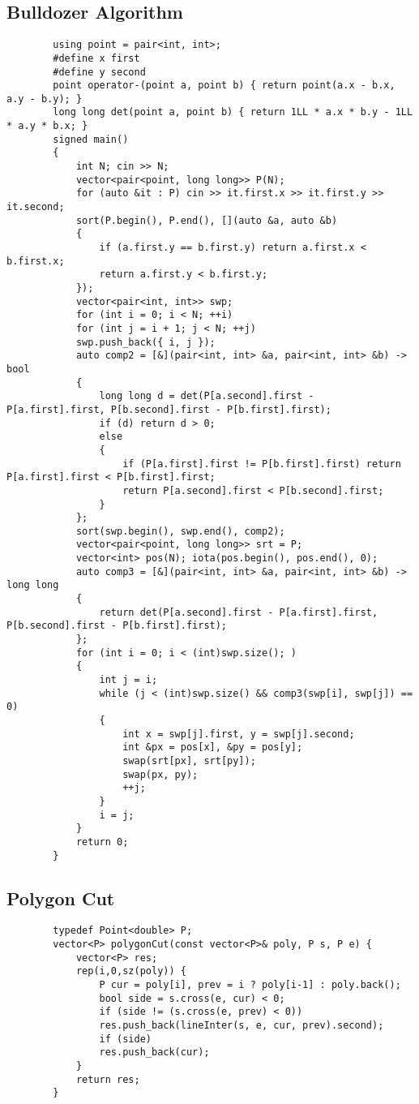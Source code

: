 \documentclass[landscape, 8pt, a4paper, oneside, twocolumn]{extarticle}
\begin{document}
	\subsection{Bulldozer Algorithm}
	\begin{verbatim}
		using point = pair<int, int>;
		#define x first
		#define y second
		point operator-(point a, point b) { return point(a.x - b.x, a.y - b.y); }
		long long det(point a, point b) { return 1LL * a.x * b.y - 1LL * a.y * b.x; }
		signed main()
		{
			int N; cin >> N;
			vector<pair<point, long long>> P(N);
			for (auto &it : P) cin >> it.first.x >> it.first.y >> it.second;
			sort(P.begin(), P.end(), [](auto &a, auto &b)
			{
				if (a.first.y == b.first.y) return a.first.x < b.first.x;
				return a.first.y < b.first.y;
			});
			vector<pair<int, int>> swp;
			for (int i = 0; i < N; ++i)
			for (int j = i + 1; j < N; ++j)
			swp.push_back({ i, j });
			auto comp2 = [&](pair<int, int> &a, pair<int, int> &b) -> bool
			{
				long long d = det(P[a.second].first - P[a.first].first, P[b.second].first - P[b.first].first);
				if (d) return d > 0;
				else
				{
					if (P[a.first].first != P[b.first].first) return P[a.first].first < P[b.first].first;
					return P[a.second].first < P[b.second].first;
				}
			};
			sort(swp.begin(), swp.end(), comp2);
			vector<pair<point, long long>> srt = P;
			vector<int> pos(N); iota(pos.begin(), pos.end(), 0);
			auto comp3 = [&](pair<int, int> &a, pair<int, int> &b) -> long long
			{
				return det(P[a.second].first - P[a.first].first, P[b.second].first - P[b.first].first);
			};
			for (int i = 0; i < (int)swp.size(); )
			{
				int j = i;
				while (j < (int)swp.size() && comp3(swp[i], swp[j]) == 0)
				{
					int x = swp[j].first, y = swp[j].second;
					int &px = pos[x], &py = pos[y];
					swap(srt[px], srt[py]);
					swap(px, py);
					++j;
				}
				i = j;
			}
			return 0;
		}
	\end{verbatim}
	\subsection{Polygon Cut}
	\begin{verbatim}
		typedef Point<double> P;
		vector<P> polygonCut(const vector<P>& poly, P s, P e) {
			vector<P> res;
			rep(i,0,sz(poly)) {
				P cur = poly[i], prev = i ? poly[i-1] : poly.back();
				bool side = s.cross(e, cur) < 0;
				if (side != (s.cross(e, prev) < 0))
				res.push_back(lineInter(s, e, cur, prev).second);
				if (side)
				res.push_back(cur);
			}
			return res;
		}
	\end{verbatim}
\end{document}

